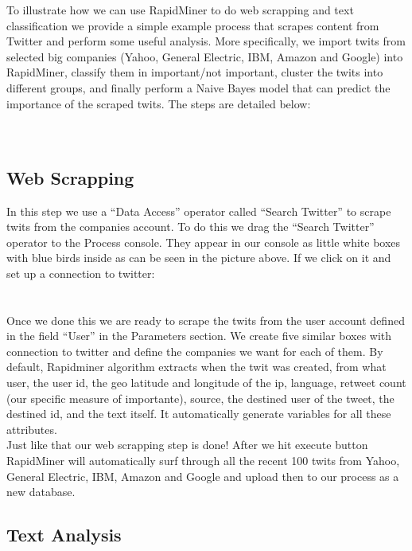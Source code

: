 \documentclass[12pt]{article}
\begin{document}
To illustrate how we can use RapidMiner to do web scrapping and text classification we provide a simple example process that scrapes content from Twitter and perform some useful analysis. More specifically, we import twits from selected big companies (Yahoo, General Electric, IBM, Amazon and Google) into RapidMiner, classify them in important/not important, cluster the twits into different groups, and finally perform a Naive Bayes model that can predict the importance of the scraped twits. The steps are detailed below: \\
\\
[FIGURE 1] \\


\subsection{Web Scrapping}

In this step we use a “Data Access” operator called “Search Twitter” to scrape twits from the companies account. To do this we drag the “Search Twitter” operator to the Process console. They appear in our console as little white boxes with blue birds inside as can be seen in the picture above. If we click on it and set up a connection to twitter: \\
\\
[FIGURE 2] \\

Once we done this we are ready to scrape the twits from the user account defined in the field “User” in the Parameters section. We create five similar boxes with connection to twitter and define the companies we want for each of them. By default, Rapidminer algorithm extracts when the twit was created, from what user, the user id, the geo latitude and longitude of the ip, language, retweet count (our specific measure of importante), source, the destined user of the tweet, the destined id, and the text itself. It automatically generate variables for all these attributes. \\

Just like that our web scrapping step is done! After we hit execute button RapidMiner will automatically surf through all the recent 100 twits from Yahoo, General Electric, IBM, Amazon and Google and upload then to our process as a new database.


\subsection{Text Analysis}
\end{document}
